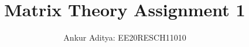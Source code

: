 \documentclass[journal,12pt,twocolumn]{IEEEtran}
\begin{document}
\makeatletter
{}
\makeatother
\let\StandardTheFigure\thefigure
\let\vec\mathbf
\renewcommand{\thefigure}{\theproblem}
\def\putbox#1#2#3{\makebox[0in][l]{\makebox[#1][l]{}\raisebox{\baselineskip}[0in][0in]{\raisebox{#2}[0in][0in]{#3}}}}
     \def\rightbox#1{\makebox[0in][r]{#1}}
     \def\centbox#1{\makebox[0in]{#1}}
     \def\topbox#1{\raisebox{-\baselineskip}[0in][0in]{#1}}
     \def\midbox#1{\raisebox{-0.5\baselineskip}[0in][0in]{#1}}
\vspace{3cm}
\title{Matrix Theory Assignment 1}
\author{Ankur Aditya: EE20RESCH11010}
\end{document}

